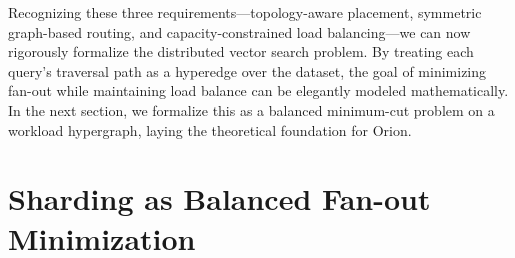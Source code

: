 Recognizing these three requirements---topology-aware placement, symmetric graph-based routing, and capacity-constrained load balancing---we can now rigorously formalize the distributed vector search problem. By treating each query's traversal path as a hyperedge over the dataset, the goal of minimizing fan-out while maintaining load balance can be elegantly modeled mathematically. In the next section, we formalize this as a balanced minimum-cut problem on a workload hypergraph, laying the theoretical foundation for Orion.
%

% 

\section{Sharding as Balanced Fan-out Minimization}
\label{sec:theory}

